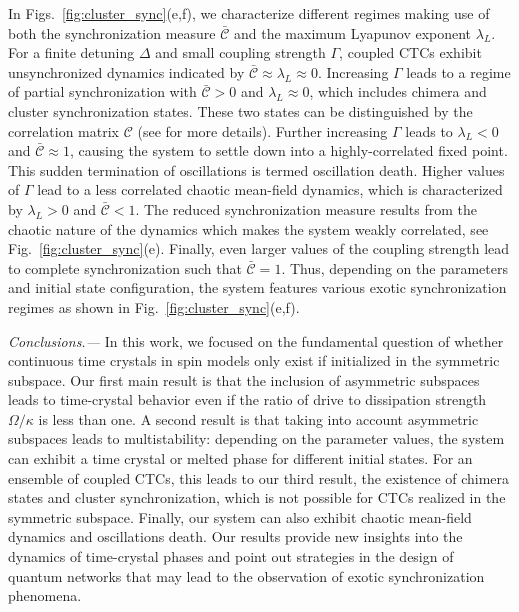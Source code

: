 \documentclass[pra,aps,twocolumn,superscriptaddress,notitlepage]{revtex4-1}
\begin{document}
	In Figs.~\ref{fig:cluster_sync}(e,f), we characterize different regimes making use of both the synchronization measure $\bar{\mathcal{C}}$ and the maximum Lyapunov exponent $\lambda_L$.
	For a finite detuning $\Delta$ and small coupling strength $\Gamma$, coupled CTCs exhibit unsynchronized dynamics indicated by $\bar{\mathcal{C}}\approx\lambda_L\approx 0$. 
	Increasing $\Gamma$ leads to a regime of partial synchronization with $\bar{\mathcal{C}}>0$ and $\lambda_L\approx 0$, which includes chimera and cluster synchronization states. 
	These two states can be distinguished by the correlation matrix $\mathcal{C}$ (see \cite{supp} for more details). 
	Further increasing $\Gamma$ leads to $\lambda_L<0$ and $\bar{\mathcal{C}}\approx 1$, causing the system to settle down into a highly-correlated fixed point. 
	This sudden termination of oscillations is termed oscillation death. Higher values of $\Gamma$ lead to a less correlated chaotic mean-field dynamics, which is characterized by $\lambda_L>0$ and $\bar{\mathcal{C}}< 1$. 
	The reduced synchronization measure results from the chaotic nature of the dynamics which makes the system weakly correlated, see Fig.~\ref{fig:cluster_sync}(e). 
	Finally, even larger values of the coupling strength lead to complete synchronization such that $\bar{\mathcal{C}}=1$. 
	Thus, depending on the parameters and initial state configuration, the system features various exotic synchronization regimes as shown in Fig.~\ref{fig:cluster_sync}(e,f).
	
	
	\noindent \textit{Conclusions.---}
	In this work, we focused on the fundamental question of whether continuous time crystals in spin models only exist if initialized in the symmetric subspace.
	Our first main result is that  
	the inclusion of asymmetric subspaces leads to time-crystal behavior even if the ratio of drive to dissipation strength  $\Omega/\kappa$ is less than one.
	A second result is that taking into account asymmetric subspaces leads to multistability: depending on the parameter values, the system can exhibit a time crystal 
	or melted phase for different initial states. 
	For an ensemble of coupled CTCs, this leads to our third result, the existence of chimera states and cluster synchronization, which is not possible for CTCs realized in the symmetric subspace.
	Finally, our system can also exhibit chaotic mean-field dynamics and oscillations death.
	Our results provide new insights into the dynamics of time-crystal phases and point out strategies in the design of quantum networks that may lead to the observation of exotic synchronization phenomena.
	
\end{document}
